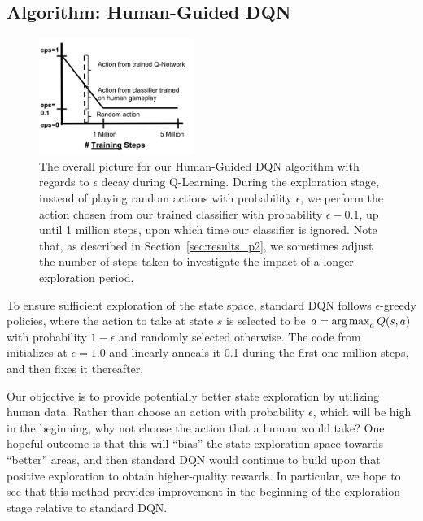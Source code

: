 \documentclass[letterpaper, 10pt, conference]{ieeeconf}
\begin{document}
\subsection{Algorithm: Human-Guided DQN}\label{ssec:algorithm}

\begin{figure}[t]
\centering
\includegraphics[width=0.45\textwidth]{figures/dqn_with_human_data_graph.png}
\caption{\footnotesize
The overall picture for our Human-Guided DQN algorithm with regards to
$\epsilon$ decay during Q-Learning. During the exploration stage, instead of
playing random actions with probability $\epsilon$, we perform the action chosen
from our trained classifier with probability $\epsilon-0.1$, up until 1 million
steps, upon which time our classifier is ignored. Note that, as described in
Section~\ref{sec:results_p2}, we sometimes adjust the number of steps taken to
investigate the impact of a longer exploration period.
}
\label{fig:human-guided-dqn}
\end{figure}

To ensure sufficient exploration of the state space, standard DQN follows
$\epsilon$-greedy policies, where the action to take at state $s$ is selected to
be $a = \operatorname*{arg\,max}_a Q(s,a)$ with probability $1-\epsilon$ and randomly selected
otherwise. The code from~\cite{mnih-dqn-2015} initializes at $\epsilon=1.0$ and
linearly anneals it 0.1 during the first one million steps, and then fixes it
thereafter.

Our objective is to provide potentially better state exploration by utilizing
human data. Rather than choose an action with probability $\epsilon$, which will
be high in the beginning, why not choose the action that a human would take? One
hopeful outcome is that this will ``bias'' the state exploration space towards
``better'' areas, and then standard DQN would continue to build upon that
positive exploration to obtain higher-quality rewards. In particular, we hope to
see that this method provides improvement in the beginning of the exploration
stage relative to standard DQN.
\end{document}
